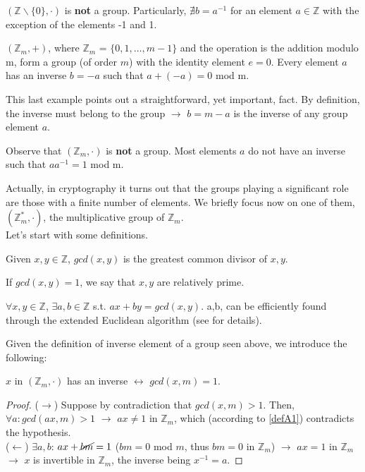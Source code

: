 \begin{myexample}
$(\mathbb{Z} \backslash \{0\},\cdot)$ is \textbf{not} a group. Particularly, $\nexists b = a^{-1}$ for an element $a \in \mathbb{Z}$ with the exception of the elements -1 and 1.
\end{myexample}
\begin{myexample}
$(\mathbb{Z}_m,+)$, where $\mathbb{Z}_m$ = $\{0,1,\dots,m-1\}$ and the operation is the addition modulo m, form a group (of order $m$) with the identity element $e = 0$. Every element $a$ has an inverse $b=-a$ such that $a + (-a) = 0$ mod m.
\end{myexample}
\begin{myrem}
This last example points out a straightforward, yet important, fact. By definition, the inverse must belong to the group $\rightarrow$ $b=m-a$ is the inverse of any group element $a$.
\end{myrem}
\begin{myrem}
Observe that $(\mathbb{Z}_m,\cdot)$ is \textbf{not} a group. Most elements $a$ do not have an inverse such that $aa^{-1} = 1$ mod m.
\end{myrem}
\noindent
Actually, in cryptography it turns out that the groups playing a significant role are those with a finite number of elements. We briefly focus now on one of them, $(\mathbb{Z}_m^{*},\cdot)$, the multiplicative group of $\mathbb{Z}_m$.\\
Let's start with some definitions.
\begin{mydef}
    Given $x,y \in \mathbb{Z}$, $gcd(x,y)$ is the greatest common divisor of $x,y$.
\end{mydef}
\label{defA2}
\begin{myrem}
    If $gcd(x,y)=1$, we say that $x,y$ are relatively prime.
\end{myrem}
\begin{mylemma}
    $\forall x,y \in \mathbb{Z}$, $\exists a,b \in \mathbb{Z}$ s.t. $ax+by=gcd(x,y)$. a,b, can be efficiently found through the extended Euclidean algorithm (see \cite{UnderstandingCrypto} for details).
\end{mylemma}
\noindent
Given the definition of inverse element of a group seen above, we introduce the following:
\begin{mylemma}
    $x$ in $(\mathbb{Z}_m,\cdot)$ has an inverse $\longleftrightarrow$ $gcd(x,m)=1$. 
\end{mylemma}
\begin{proof} ($\longrightarrow$) Suppose by contradiction that $gcd(x,m)>1$. Then, $\forall a: gcd(ax,m)>1$ $\rightarrow$ $ax \neq 1$ in $\mathbb{Z}_m$, which (according to \ref{defA1}) contradicts the hypothesis.\\
($\longleftarrow$) $\exists a,b$: $ax + \cancel{bm} = 1$ ($bm = 0$ mod $m$, thus $bm=0$ in $\mathbb{Z}_m$) $\rightarrow$ $ax=1$ in $\mathbb{Z}_m$ $\rightarrow$ $x$ is invertible in $\mathbb{Z}_m$, the inverse being $x^{-1}=a$.
\end{proof}
